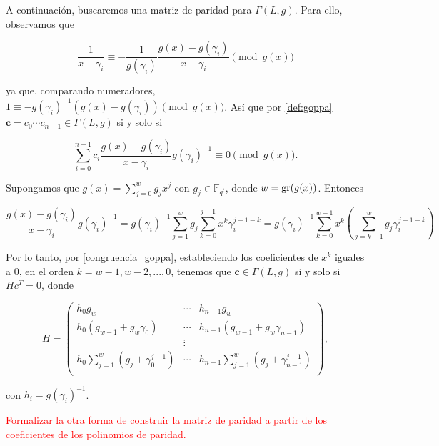 A continuación, buscaremos una matriz de paridad para $\Gamma(L,g)$. Para ello, observamos que

$$\frac{1}{x - \gamma_i} \equiv - \frac{1}{g(\gamma_i)} \frac{g(x) - g(\gamma_i)}{x - \gamma_i} \pmod{ g(x)}$$

ya que, comparando numeradores, $1 \equiv - g(\gamma_i)^{-1} \left( g(x) - g(\gamma_i) \right) \pmod{g(x)}$. Así que por \eqref{def:goppa} $\textbf{c} = c_0 \cdots c_{n-1} \in \Gamma(L,g)$ si y solo si

\begin{equation}
    \label{congruencia_goppa}
    \sum_{i=0}^{n-1} c_i \frac{g(x) - g(\gamma_i)}{x - \gamma_i} g(\gamma_i)^{-1} \equiv 0 \pmod{g(x)}.
\end{equation}

Supongamos que $g(x) = \sum_{j=0}^w g_j x^j$ con $g_j \in \mathbb{F}_{q^t}$, donde $w = \operatorname{gr}(g(x))$. Entonces

$$\frac{g(x) - g(\gamma_i)}{x - \gamma_i} g(\gamma_i)^{-1} = g(\gamma_i)^{-1} \sum_{j=1}^w g_j \sum_{k=0}^{j-1} x^k \gamma_i^{j-1-k} = g(\gamma_i)^{-1} \sum_{k=0}^{w-1} x^k \left( \sum_{j=k+1}^w g_j \gamma_i^{j-1-k} \right)$$

Por lo tanto, por \eqref{congruencia_goppa}, estableciendo los coeficientes de $x^k$ iguales a $0$, en el orden $k = w - 1, w - 2, ..., 0$, tenemos que $\textbf{c} \in \Gamma(L,g)$ si y solo si $Hc^T = 0$, donde 

\begin{equation}
    H = \left(
        \begin{array}{ccc} 
            h_0 g_w & \cdots & h_{n-1} g_w  \\
            h_0 (g_{w-1} + g_w \gamma_0) & \cdots & h_{n-1} (g_{w-1} + g_w \gamma_{n-1}) \\
            & \vdots & \\
            h_0 \sum_{j=1}^w \left( g_j + \gamma_0^{j-1} \right) & \cdots & h_{n-1} \sum_{j=1}^w \left( g_{j} + \gamma_{n-1}^{j-1} \right) \\
        \end{array}
        \right),
\end{equation}

con $h_i = g(\gamma_i)^{-1}$.

\textcolor{red}{Formalizar la otra forma de construir la matriz de paridad a partir de los coeficientes de los polinomios de paridad.}

